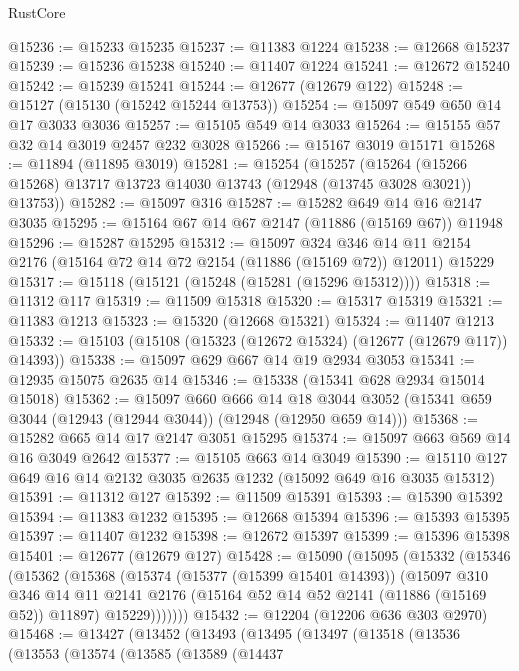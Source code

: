 \begin{lexlean}{RustCore}
\begin{coremodule}
@15236 := @15233 @15235
@15237 := @11383 @1224
@15238 := @12668 @15237
@15239 := @15236 @15238
@15240 := @11407 @1224
@15241 := @12672 @15240
@15242 := @15239 @15241
@15244 := @12677 (@12679 @122)
@15248 := @15127 (@15130 (@15242 @15244 @13753))
@15254 := @15097 @549 @650 @14 @17 @3033 @3036
@15257 := @15105 @549 @14 @3033
@15264 := @15155 @57 @32 @14 @3019 @2457 @232 @3028
@15266 := @15167 @3019 @15171
@15268 := @11894 (@11895 @3019)
@15281 := @15254
    (@15257
      (@15264 (@15266 @15268) @13717 @13723 @14030 @13743 (@12948 (@13745 @3028 @3021)) @13753))
@15282 := @15097 @316
@15287 := @15282 @649 @14 @16 @2147 @3035
@15295 := @15164 @67 @14 @67 @2147 (@11886 (@15169 @67)) @11948
@15296 := @15287 @15295
@15312 := @15097
    @324
    @346
    @14
    @11
    @2154
    @2176
    (@15164 @72 @14 @72 @2154 (@11886 (@15169 @72)) @12011)
    @15229
@15317 := @15118 (@15121 (@15248 (@15281 (@15296 @15312))))
@15318 := @11312 @117
@15319 := @11509 @15318
@15320 := @15317 @15319
@15321 := @11383 @1213
@15323 := @15320 (@12668 @15321)
@15324 := @11407 @1213
@15332 := @15103 (@15108 (@15323 (@12672 @15324) (@12677 (@12679 @117)) @14393))
@15338 := @15097 @629 @667 @14 @19 @2934 @3053
@15341 := @12935 @15075 @2635 @14
@15346 := @15338 (@15341 @628 @2934 @15014 @15018)
@15362 := @15097
    @660
    @666
    @14
    @18
    @3044
    @3052
    (@15341 @659 @3044 (@12943 (@12944 @3044)) (@12948 (@12950 @659 @14)))
@15368 := @15282 @665 @14 @17 @2147 @3051 @15295
@15374 := @15097 @663 @569 @14 @16 @3049 @2642
@15377 := @15105 @663 @14 @3049
@15390 := @15110 @127 @649 @16 @14 @2132 @3035 @2635 @1232 (@15092 @649 @16 @3035 @15312)
@15391 := @11312 @127
@15392 := @11509 @15391
@15393 := @15390 @15392
@15394 := @11383 @1232
@15395 := @12668 @15394
@15396 := @15393 @15395
@15397 := @11407 @1232
@15398 := @12672 @15397
@15399 := @15396 @15398
@15401 := @12677 (@12679 @127)
@15428 := @15090
    (@15095
      (@15332
        (@15346
          (@15362
            (@15368
              (@15374
                (@15377 (@15399 @15401 @14393))
                (@15097
                  @310
                  @346
                  @14
                  @11
                  @2141
                  @2176
                  (@15164 @52 @14 @52 @2141 (@11886 (@15169 @52)) @11897)
                  @15229)))))))
@15432 := @12204 (@12206 @636 @303 @2970)
@15468 := @13427
    (@13452
      (@13493
        (@13495
          (@13497
            (@13518
              (@13536
                (@13553
                  (@13574
                    (@13585
                      (@13589
                        (@14437

\end{coremodule}
\end{lexlean}
